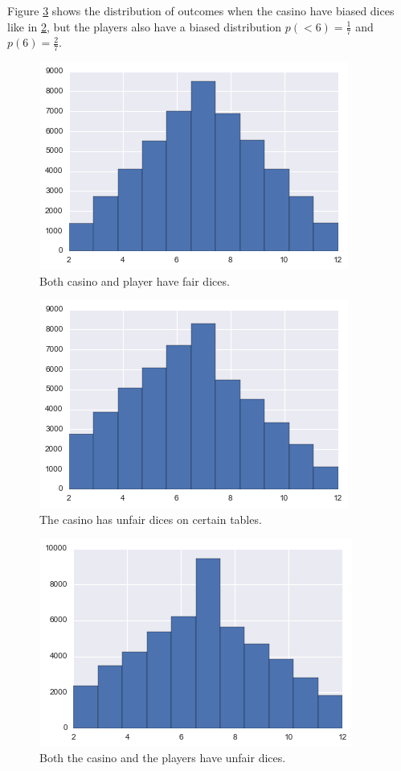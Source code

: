 \documentclass[12pt]{article}
\begin{document}
Figure \ref{casino_p_unfair} shows the distribution of outcomes when the casino have biased dices like in \ref{casino_c_unfair}, but the players also have a biased distribution $p(<6) = \frac{1}{7}$ and $p(6) = \frac{2}{7}$.

\begin{figure}
\includegraphics[]{casino_fair}
\centering
\caption{Both casino and player have fair dices.}
\label{casino_fair}
\end{figure}

\begin{figure}
\includegraphics[]{casino_c_unfair}
\centering
\caption{The casino has unfair dices on certain tables.}
\label{casino_c_unfair}
\end{figure}

\begin{figure}
\includegraphics[]{casino_p_unfair}
\centering
\caption{Both the casino and the players have unfair dices.}
\label{casino_p_unfair}
\end{figure}
\end{document}
